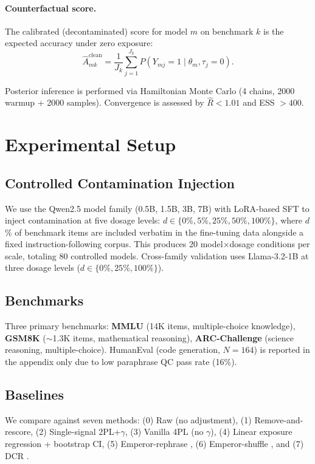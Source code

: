 \documentclass[11pt,a4paper]{article}
\begin{document}
\paragraph{Counterfactual score.}
The calibrated (decontaminated) score for model $m$ on benchmark $k$ is the expected accuracy under zero exposure:
\begin{equation}
    \hat{A}^{\text{clean}}_{mk} = \frac{1}{J_k}\sum_{j=1}^{J_k} P(Y_{mj}=1 \mid \theta_m, \tau_j = 0).
    \label{eq:counterfactual}
\end{equation}

Posterior inference is performed via Hamiltonian Monte Carlo (4 chains, 2000 warmup + 2000 samples). Convergence is assessed by $\hat{R} < 1.01$ and ESS $> 400$.

\section{Experimental Setup}
\label{sec:setup}

\subsection{Controlled Contamination Injection}

We use the Qwen2.5 model family (0.5B, 1.5B, 3B, 7B) with LoRA-based SFT to inject contamination at five dosage levels: $d \in \{0\%, 5\%, 25\%, 50\%, 100\%\}$, where $d$\% of benchmark items are included verbatim in the fine-tuning data alongside a fixed instruction-following corpus. This produces 20 model$\times$dosage conditions per scale, totaling 80 controlled models. Cross-family validation uses Llama-3.2-1B at three dosage levels ($d \in \{0\%, 25\%, 100\%\}$).

\subsection{Benchmarks}
Three primary benchmarks: \textbf{MMLU} (14K items, multiple-choice knowledge), \textbf{GSM8K} ($\sim$1.3K items, mathematical reasoning), \textbf{ARC-Challenge} (science reasoning, multiple-choice). HumanEval (code generation, $N=164$) is reported in the appendix only due to low paraphrase QC pass rate (16\%).

\subsection{Baselines}
We compare against seven methods: (0) Raw (no adjustment), (1) Remove-and-rescore, (2) Single-signal 2PL+$\gamma$, (3) Vanilla 4PL (no $\gamma$), (4) Linear exposure regression + bootstrap CI, (5) Emperor-rephrase \citep{xu2024benchmarking}, (6) Emperor-shuffle \citep{xu2024benchmarking}, and (7) DCR \citep{dong2024dcr}.
\end{document}
